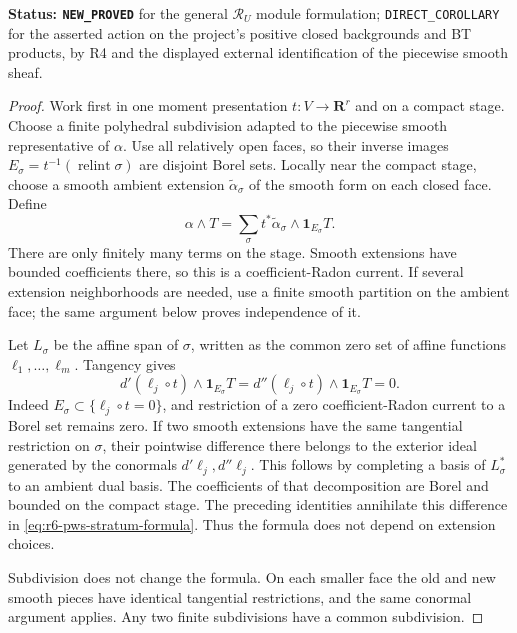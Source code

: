 \documentclass[11pt,a4paper]{article}
\numberwithin{equation}{section}
\theoremstyle{definition}
\theoremstyle{remark}
\begin{document}
\noindent\textbf{Status: \texttt{NEW\_PROVED}} for the general
$\mathscr R_U$ module formulation; \texttt{DIRECT\_COROLLARY}
for the asserted action on the project's positive closed
backgrounds and BT products, by R4 and the displayed external
identification of the piecewise smooth sheaf.

\begin{proof}
Work first in one moment presentation $t:V\to\mathbf R^r$ and
on a compact stage. Choose a finite polyhedral subdivision
adapted to the piecewise smooth representative of $\alpha$.
Use all relatively open faces, so their inverse images
$E_\sigma=t^{-1}(\operatorname{relint}\sigma)$ are disjoint
Borel sets. Locally near the compact stage, choose a smooth
ambient extension $\widetilde\alpha_\sigma$ of the smooth
form on each closed face. Define
\begin{equation}
 \alpha\wedge T
   =\sum_\sigma t^*\widetilde\alpha_\sigma
                      \wedge\mathbf1_{E_\sigma}T.
 \label{eq:r6-pws-stratum-formula}
\end{equation}
There are only finitely many terms on the stage. Smooth
extensions have bounded coefficients there, so this is a
coefficient-Radon current. If several extension neighborhoods
are needed, use a finite smooth partition on the ambient
face; the same argument below proves independence of it.

Let $L_\sigma$ be the affine span of $\sigma$, written as the
common zero set of affine functions $\ell_1,\ldots,\ell_m$.
Tangency gives
\[
 d'(\ell_j\circ t)\wedge\mathbf1_{E_\sigma}T
  =d''(\ell_j\circ t)\wedge\mathbf1_{E_\sigma}T=0.
\]
Indeed $E_\sigma\subset\{\ell_j\circ t=0\}$, and restriction
of a zero coefficient-Radon current to a Borel set remains
zero. If two smooth extensions have the same tangential
restriction on $\sigma$, their pointwise difference there
belongs to the exterior ideal generated by the conormals
$d'\ell_j,d''\ell_j$. This follows by completing a basis of
$L_\sigma^*$ to an ambient dual basis. The coefficients of
that decomposition are Borel and bounded on the compact
stage. The preceding identities annihilate this difference
in \eqref{eq:r6-pws-stratum-formula}. Thus the formula does
not depend on extension choices.

Subdivision does not change the formula. On each smaller
face the old and new smooth pieces have identical tangential
restrictions, and the same conormal argument applies.
Any two finite subdivisions have a common subdivision.


\end{proof}
\end{document}
